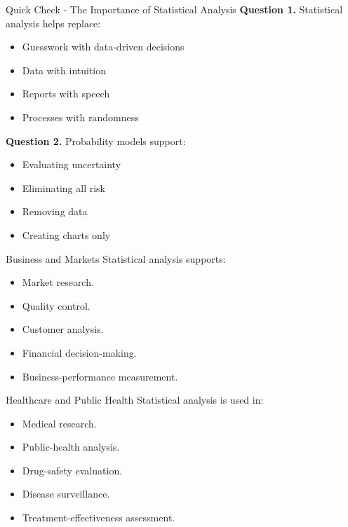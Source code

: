 \documentclass[aspectratio=169,11pt]{beamer}
\begin{document}
\begin{frame}[allowframebreaks]{Quick Check - The Importance of Statistical Analysis}
\footnotesize
\textbf{Question 1.} Statistical analysis helps replace:\par\medskip
\begin{itemize}
\item[\textbf{A.}] Guesswork with data-driven decisions
\item[\textbf{B.}] Data with intuition
\item[\textbf{C.}] Reports with speech
\item[\textbf{D.}] Processes with randomness
\end{itemize}
\textbf{Question 2.} Probability models support:\par\medskip
\begin{itemize}
\item[\textbf{A.}] Evaluating uncertainty
\item[\textbf{B.}] Eliminating all risk
\item[\textbf{C.}] Removing data
\item[\textbf{D.}] Creating charts only
\end{itemize}
\end{frame}
\begin{frame}[allowframebreaks]{Business and Markets}
\small
Statistical analysis supports:\par\medskip
\begin{itemize}
\item Market research.
\item Quality control.
\item Customer analysis.
\item Financial decision-making.
\item Business-performance measurement.
\end{itemize}
\end{frame}
\begin{frame}[allowframebreaks]{Healthcare and Public Health}
\small
Statistical analysis is used in:\par\medskip
\begin{itemize}
\item Medical research.
\item Public-health analysis.
\item Drug-safety evaluation.
\item Disease surveillance.
\item Treatment-effectiveness assessment.
\end{itemize}
\end{frame}
\end{document}
